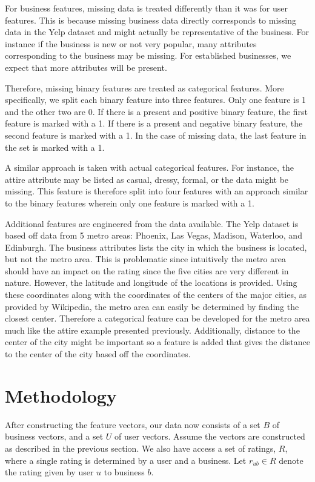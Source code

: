 \documentclass[11pt]{article}
\begin{document}
For business features, missing data is treated differently than it was for user features. This is because missing business data directly corresponds to missing data in the Yelp dataset and might actually be representative of the business. For instance if the business is new or not very popular, many attributes corresponding to the business may be missing. For established businesses, we expect that more attributes will be present. 

Therefore, missing binary features are treated as categorical features. More specifically, we split each binary feature into three features. Only one feature is 1 and the other two are 0. If there is a present and positive binary feature, the first feature is marked with a 1. If there is a present and negative binary feature, the second feature is marked with a 1. In the case of missing data, the last feature in the set is marked with a 1. 

A similar approach is taken with actual categorical features. For instance, the attire attribute may be listed as casual, dressy, formal, or the data might be missing. This feature is therefore split into four features with an approach similar to the binary features wherein only one feature is marked with a 1.

Additional features are engineered from the data available. The Yelp dataset is based off data from 5 metro areas: Phoenix, Las Vegas, Madison, Waterloo, and Edinburgh. The business attributes lists the city in which the business is located, but not the metro area. This is problematic since intuitively the metro area should have an impact on the rating since the five cities are very different in nature. However, the latitude and longitude of the locations is provided. Using these coordinates along with the coordinates of the centers of the major cities, as provided by Wikipedia, the metro area can easily be determined by finding the closest center. Therefore a categorical feature can be developed for the metro area much like the attire example presented previously. Additionally, distance to the center of the city might be important so a feature is added that gives the distance to the center of the city based off the coordinates.

\section{Methodology}
After constructing the feature vectors, our data now consists of a set $B$ of business vectors, and a set $U$ of user vectors. Assume the vectors are constructed as described in the previous section. We also have access a set of ratings, $R$, where a single rating is determined by a user and a business. Let $r_{ub} \in R$ denote the rating given by user $u$ to business $b$.
\end{document}
